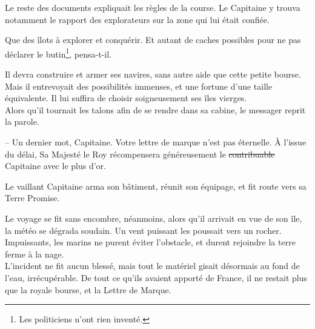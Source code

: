 \newpage

Le reste des documents expliquait les règles de la course. Le
Capitaine y trouva notamment le rapport des explorateurs sur la zone
qui lui était confiée.

Que des îlots à explorer et conquérir. Et autant de caches possibles
pour ne pas déclarer le butin\footnote{Les politiciens n'ont rien
inventé.}, pensa-t-il.

Il devra construire et armer ses navires, sans autre aide que cette
petite bourse. Mais il entrevoyait des possibilités immenses, et une
fortune d'une taille équivalente. Il lui suffira de choisir
soigneusement ses îles vierges.\\

Alors qu'il tournait les talons afin de se rendre dans sa cabine, le
messager reprit la parole.

-- Un dernier mot, Capitaine. Votre lettre de marque n'est pas
   éternelle. À l'issue du délai, Sa Majesté le Roy récompensera
   généreusement le \st{contribuable} Capitaine avec le plus d'or.

\culdelampe{}

Le vaillant Capitaine arma son bâtiment, réunit son équipage, et fit
route vers sa Terre Promise.

Le voyage se fit sans encombre, néanmoins, alors qu'il arrivait en vue
de son île, la météo se dégrada soudain. Un vent puissant les poussait
vers un rocher. Impuissants, les marins ne purent éviter l'obstacle,
et durent rejoindre la terre ferme à la nage.\\

L'incident ne fit aucun blessé, mais tout le matériel gisait désormais
au fond de l'eau, irrécupérable. De tout ce qu'ils avaient apporté de
France, il ne restait plus que la royale bourse, et la Lettre de
Marque.\\


